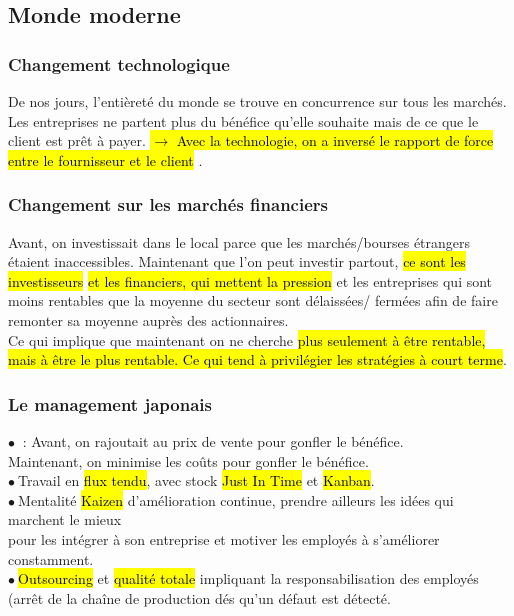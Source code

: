 \documentclass[letterpaper, 12pt]{article}
\newcommand{\myul}[1]{
	\underline{\smash{#1}}
}
\newcommand{\red}[1]{
	\textcolor{red}{#1}
}
\newcommand{\point}{$\bullet\ $}
\newcommand{\alinea}{
\hspace*{0.3cm}}
\begin{document}
	\subsection{Monde moderne}
		\subsubsection{Changement technologique}
			De nos jours, l'enti\`eret\'e du monde se trouve en concurrence sur tous les march\'es. Les
			entreprises ne partent plus du b\'en\'efice qu'elle souhaite mais de ce que le
			client est prêt \`a payer.\red{\hl{$\rightarrow$ Avec la technologie, on a invers\'e le
			rapport de 	force entre le fournisseur et le client}}.
		\subsubsection{Changement sur les march\'es financiers}
			\alinea Avant, on investissait dans le local parce que les march\'es/bourses \'etrangers 
				\'etaient inaccessibles. Maintenant que l'on peut investir partout, \hl{ce sont les 
				investisseurs} \red{\hl{et les financiers, qui mettent la pression}} et les 
				entreprises qui sont moins  rentables que la moyenne du secteur sont d\'elaiss\'ees/ 
				ferm\'ees afin de faire remonter sa moyenne aupr\`es des actionnaires.\\
			\alinea Ce qui implique que maintenant on ne cherche \hl{plus seulement \`a \^etre 
				rentable, mais \`a \^etre le plus rentable. Ce qui tend \`a privil\'egier les 
				strat\'egies \`a court terme}.
		\subsubsection{Le management japonais}
			\point \myul{Logique soustractive} : Avant, on rajoutait au prix de vente pour gonfler le 
				b\'en\'efice.\\\alinea Maintenant, on minimise les co\^uts pour gonfler le b\'en\'efice.\\
			\point Travail en \hl{flux tendu}, avec stock \hl{Just In Time} et \hl{Kanban}.\\
			\point Mentalit\'e \hl{Kaizen} d'am\'elioration continue, prendre ailleurs les id\'ees qui
				marchent  
				le mieux \\\alinea pour les int\'egrer \`a son entreprise et motiver les employ\'es \`a
				s'am\'eliorer constamment.\\
			\point \hl{Outsourcing} et \hl{qualit\'e totale} impliquant la responsabilisation
				des employés \\\alinea (arrêt de la chaîne de production d\'es qu'un  
				d\'efaut est d\'etect\'e.
\end{document}
